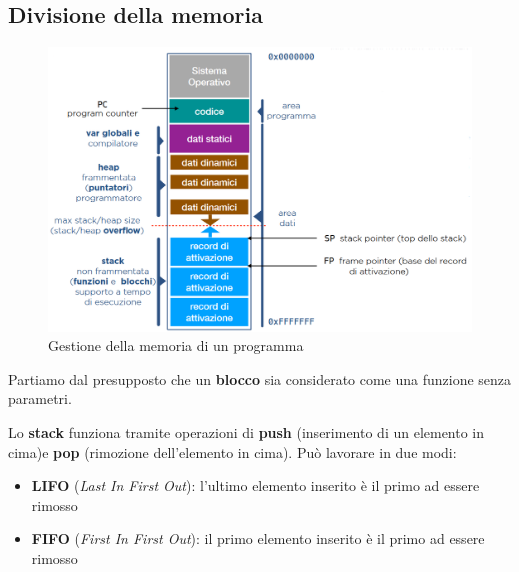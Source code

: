 \subsection{Divisione della memoria}
\begin{figure}[h!]
	\centering
	\includegraphics[width=13cm]{images/gestione-memoria.png}
	\caption{Gestione della memoria di un programma}
\end{figure}
\begin{note}
	Partiamo dal presupposto che un \textbf{blocco} sia considerato come una funzione senza parametri.
\end{note}
\begin{note}
	Lo \textbf{stack} funziona tramite operazioni di \textbf{push} (inserimento di un elemento in cima)e \textbf{pop} (rimozione dell'elemento in cima). Può lavorare in due modi:
	\begin{itemize}
		\item  \textbf{LIFO} (\emph{Last In First Out}): l'ultimo elemento inserito è il primo ad essere rimosso
		\item  \textbf{FIFO} (\emph{First In First Out}): il primo elemento inserito è il primo ad essere rimosso
	\end{itemize} 
\end{note}

